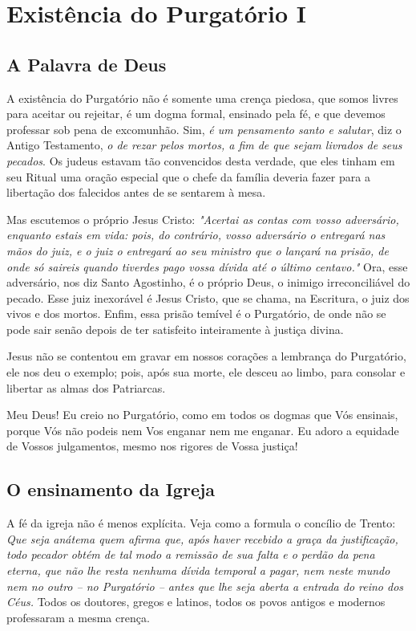 \renewcommand{\thechapterdisplay}{Terceiro dia}
\renewcommand{\thechapterrunner}{Existência do Purgatório I}
\chapter[Terceiro dia --- Existência do Purgatório I]{Existência do Purgatório I}
\section*{A Palavra de Deus}

A existência do Purgatório não é somente uma crença piedosa, que somos livres para aceitar ou rejeitar, é um dogma formal, ensinado pela fé, e que devemos professar sob pena de excomunhão. Sim, \textit{é um pensamento santo e salutar}, diz o Antigo Testamento, \textit{o de rezar pelos mortos, a fim de que sejam livrados de seus pecados}. Os judeus estavam tão convencidos desta verdade, que eles tinham em seu Ritual uma oração especial que o chefe da família deveria fazer para a libertação dos falecidos antes de se sentarem à mesa.

Mas escutemos o próprio Jesus Cristo: \textit{"Acertai as contas com vosso adversário, enquanto estais em vida: pois, do contrário, vosso adversário o entregará nas mãos do juiz, e o juiz o entregará ao seu ministro que o lançará na prisão, de onde só saireis quando tiverdes pago vossa dívida até o último centavo."} Ora, esse adversário, nos diz Santo Agostinho, é o próprio Deus, o inimigo irreconciliável do pecado. Esse juiz inexorável é Jesus Cristo, que se chama, na Escritura, o juiz dos vivos e dos mortos. Enfim, essa prisão temível é o Purgatório, de onde não se pode sair senão depois de ter satisfeito inteiramente à justiça divina.

Jesus não se contentou em gravar em nossos corações a lembrança do Purgatório, ele nos deu o exemplo; pois, após sua morte, ele desceu ao limbo, para consolar e libertar as almas dos Patriarcas. 

Meu Deus! Eu creio no Purgatório, como em todos os dogmas que Vós ensinais, porque Vós não podeis nem Vos enganar nem me enganar. Eu adoro a equidade de Vossos julgamentos, mesmo nos rigores de Vossa justiça!


\section*{O ensinamento da Igreja}

A fé da igreja não é menos explícita. Veja como a formula o concílio de Trento: \textit{Que seja anátema quem afirma que, após haver recebido a graça da justificação, todo pecador obtém de tal modo a remissão de sua falta e o perdão da pena eterna, que não lhe resta nenhuma dívida temporal a pagar, nem neste mundo nem no outro -- no Purgatório -- antes que lhe seja aberta a entrada do reino dos Céus.} Todos os doutores, gregos e latinos, todos os povos antigos e modernos
professaram a mesma crença.

